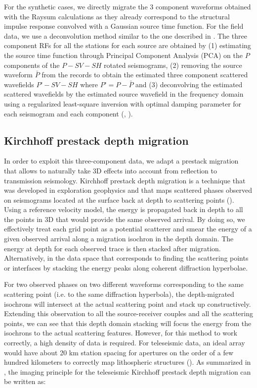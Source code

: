 \documentclass[9pt,a4paper]{article}
\numberwithin{equation}{section}
\begin{document}
\begin{multicols}{2}
For the synthetic cases, we directly migrate the 3 component waveforms obtained with the Raysum calculations as they already correspond to the structural impulse response convolved with a Gaussian source time function. 
For the field data, we use a deconvolution method similar to the one described in \cite{rond_sgeo_09}. 
The three component RFs for all the stations for each source are obtained by (1) estimating the source time function through Principal Component Analysis (PCA) on the $P$ components of the $P-SV-SH$ rotated seismograms, (2) removing the source waveform $\bar{P}$ from the records to obtain the estimated three component scattered wavefields $P’-SV-SH$ where $P’=P-\bar{P}$ and (3) deconvolving the estimated scattered wavefields by the estimated source wavefield in the frequency domain using a regularized least-square inversion with optimal damping parameter for each seismogram and each component (\cite{pear_jgr_12}, \cite{bost_gji_99}).

\subsection{Kirchhoff prestack depth migration}

In order to exploit this three-component data, we adapt a prestack migration that allows to naturally take 3D effects into account from reflection to transmission seismology. 
Kirchhoff prestack depth migration is a technique that was developed in exploration geophysics and that maps scattered phases observed on seismograms located at the surface back at depth to scattering points (\cite{ylma_book_01}).
Using a reference velocity model, the energy is propagated back in depth to all the points in 3D that would provide the same observed arrival.
By doing so, we effectively treat each grid point as a potential scatterer and smear the energy of a given observed arrival along a migration isochron in the depth domain.
The energy at depth for each observed trace is then stacked after migration.
Alternatively, in the data space that corresponds to finding the scattering points or interfaces by stacking the energy peaks along coherent diffraction hyperbolae.

For two observed phases on two different waveforms corresponding to the same scattering point (i.e. to the same diffraction hyperbola), the depth-migrated isochrons will intersect at the actual scattering point and stack up constructively.
Extending this observation to all the source-receiver couples and all the scattering points, we can see that this depth domain stacking will focus the energy from the isochrons to the actual scattering features.
However, for this method to work correctly, a high density of data is required.
For teleseismic data, an ideal array would have about 20 km station spacing for apertures on the order of a few hundred kilometers to correctly map lithospheric structures (\cite{rond_sgeo_09}).
As summarized in \cite{rond_sgeo_09}, the imaging principle for the teleseismic Kirchhoff prestack depth migration can be written as:


\end{multicols}
\end{document}
